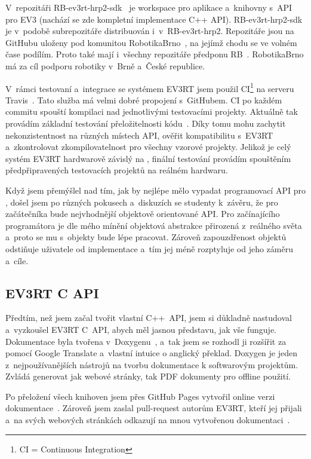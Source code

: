 V~repozitáři RB-ev3rt-hrp2-sdk~\cite{RB-ev3rt-hrp2-sdk-github} je workspace pro aplikace a~knihovny s~API pro EV3 (nachází se zde kompletní implementace C++ API). RB-ev3rt-hrp2-sdk je v~podobě subrepozitáře distribuován i~v~RB-ev3rt-hrp2. Repozitáře jsou na GitHubu uloženy pod komunitou RobotikaBrno~\cite{RobotikaBrno-web}, na jejímž chodu se ve volném čase podílím. Proto také mají i~všechny repozitáře předponu RB~\cite{RoboticsBrno-github}. RobotikaBrno má za cíl podporu robotiky v~Brně a~České republice.

V~rámci testovaní a~integrace se systémem EV3RT jsem použil CI\footnote{CI = Continuous Integration} na serveru Travis~\cite{Travis-web}.
Tato služba má velmi dobré propojení s~GitHubem. 
CI po každém commitu spouští kompilaci nad jednotlivými testovacími projekty.
Aktuálně tak provádím základní testování přeložitelnosti kódu~\cite{Travis-RB-ev3rt-hrp2-sdk}.
Díky tomu mohu zachytit nekonzistentnost na různých místech API, ověřit kompatibilitu s~EV3RT a~zkontrolovat zkompilovatelnost pro všechny vzorové projekty.  
Jelikož je celý systém EV3RT hardwarově závislý na \legoEV{}, finální testování provádím spouštěním předpřipravených testovacích projektů na reálném hardwaru.

Když jsem přemýšlel nad tím, jak by nejlépe mělo vypadat programovací API pro \lego{}, došel jsem po různých pokusech a~diskuzích se studenty k~závěru, že pro začátečníka bude nejvhodnější objektově orientované API.
Pro začínajícího programátora je dle mého mínění objektová abstrakce přirozená z~reálného světa a~proto se mu s~objekty bude lépe pracovat.
Zároveň zapouzdřenost objektů odstiňuje uživatele od implementace a~tím jej méně rozptyluje od jeho záměru a~cíle.

\subsection{EV3RT C API}


Předtím, než jsem začal tvořit vlastní C++~API, jsem si důkladně nastudoval a~vyzkoušel EV3RT C~API, abych měl jasnou představu, jak vše funguje.
Dokumentace byla tvořena v~Doxygenu~\cite{doxygen-web}, a~tak jsem se rozhodl ji rozšířit za pomocí Google Translate a~vlastní intuice o anglický překlad.
Doxygen je jeden z~nejpoužívanějších nástrojů na tvorbu dokumentace k softwarovým projektům. 
Zvládá generovat jak webové stránky, tak PDF dokumenty pro offline použití.

Po přeložení všech knihoven jsem přes GitHub Pages vytvořil online verzi dokumentace~\cite{roboticsbrno-EV3RT-API-Reference}.
Zároveň jsem zaslal pull-request autorům EV3RT, kteří jej přijali a~na svých webových stránkách odkazují na mnou vytvořenou dokumentaci~\cite{EV3RT-git-web_documentation}.

